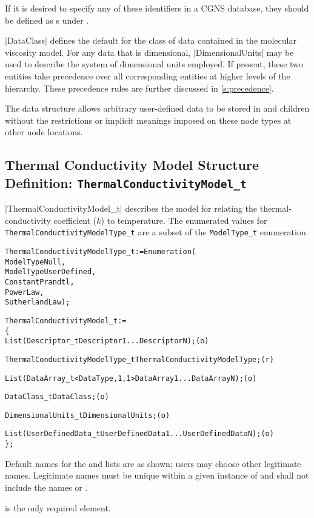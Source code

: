 If it is desired to specify any of these identifiers in a CGNS
database, they should be defined as s under
.

|DataClass| defines the default for the class of data contained in the
molecular viscosity model.
For any data that is dimensional, |DimensionalUnits| may be used to
describe the system of dimensional units employed.
If present, these two entities take precedence over all corresponding
entities at higher levels of the hierarchy.
These precedence rules are further discussed in \autoref{s:precedence}.

The  data structure allows arbitrary
user-defined data to be stored in  and
 children without the restrictions or implicit
meanings imposed on these node types at other node locations.

\subsection{Thermal Conductivity Model Structure Definition: \texttt{ThermalConductivityModel\_t}} 

|ThermalConductivityModel_t| describes the model for relating the
thermal-conductivity coefficient ($k$) to temperature.
The enumerated values for \texttt{ThermalConductivityModelType\_t} are a subset of the
\texttt{ModelType\_t} enumeration.
\begin{alltt}
  ThermalConductivityModelType\_t := Enumeration(
    ModelTypeNull,
    ModelTypeUserDefined,
    ConstantPrandtl,
    PowerLaw,
    SutherlandLaw ) ;

  ThermalConductivityModel\_t :=
    \{
    List( Descriptor\_t Descriptor1 ... DescriptorN ) ;                      (o)

    ThermalConductivityModelType\_t ThermalConductivityModelType ;           (r)
    
    List( DataArray\_t<DataType, 1, 1> DataArray1 ... DataArrayN ) ;         (o)

    DataClass\_t DataClass ;                                                 (o)
                
    DimensionalUnits\_t DimensionalUnits ;                                   (o)

    List( UserDefinedData\_t UserDefinedData1 ... UserDefinedDataN ) ;       (o)
    \} ;
\end{alltt}

\begin{notes}
\item
 Default names for the  and 
 lists are as shown; users may choose other legitimate names.
 Legitimate names must be unique within a given instance of
  and shall not include the names
  or .
\item
  is the only required element.
\end{notes}

